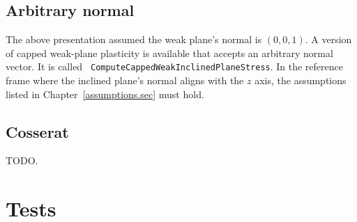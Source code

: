 \documentclass[]{scrreprt}
\begin{document}
\section{Arbitrary normal}

The above presentation assumed the weak plane's normal is $(0, 0, 1)$.
A version of capped weak-plane plasticity is available that accepts an
arbitrary normal vector.  It is called {\tt
  ComputeCappedWeakInclinedPlaneStress}.  In the reference frame where
the inclined plane's normal aligns with the $z$ axis, the assumptions
listed in Chapter~\ref{assumptions.sec} must hold.

\section{Cosserat}

TODO.

\chapter{Tests}
\end{document}
